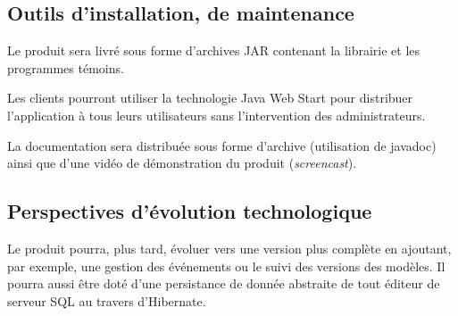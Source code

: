 \subsection{Outils d’installation, de maintenance}

Le produit sera livré sous forme d'archives JAR contenant la librairie et les programmes témoins.

Les clients pourront utiliser la technologie Java Web Start pour distribuer l'application à tous leurs utilisateurs sans l'intervention des administrateurs.

La documentation sera distribuée sous forme d'archive (utilisation de javadoc) ainsi que d'une vidéo de démonstration du produit (\emph{screencast}).

\subsection{Perspectives d’évolution technologique}

Le produit pourra, plus tard, évoluer vers une version plus complète en ajoutant, par exemple, une gestion des événements ou le suivi des versions des modèles.
Il pourra aussi être doté d'une persistance de donnée abstraite de tout éditeur de serveur SQL au travers d'Hibernate.
